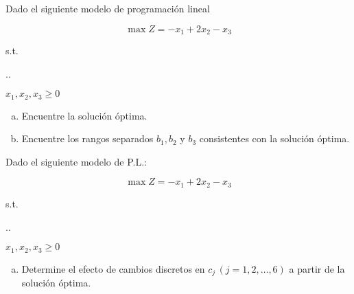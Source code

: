 \documentclass[spanish,letterpaper,11pt]{exam}
\author{Dr. Rafael Torres Escobar}
\begin{document}
\begin{questions}
    \question
    Dado el siguiente modelo de programación lineal

    \[ \max Z = -x_1 + 2x_2 - x_3 \]
  
{\centering
\vspace{2mm}
s.t.
\vspace{2mm}

%
\sysdelim..%

\vspace{3mm}
$x_1, x_2, x_3 \geq 0$
\par}
  
\begin{enumerate}[a)] 
\item Encuentre la solución óptima.
  
\item Encuentre los rangos separados $b_1, b_2 $ y $b_3$ consistentes con la solución óptima.
  
\end{enumerate}




  
\vspace{6mm}

  \question
  Dado el siguiente modelo de P.L.:

  \[ \max Z = -x_1 + 2x_2 - x_3 \]

  
{\centering
\vspace{2mm}
s.t.
\vspace{2mm}

%
\sysdelim..%

\vspace{3mm}

$x_1,x_2,x_3 \geq 0$
\par}


\begin{enumerate}[a)]
    \item Determine el efecto de cambios discretos en $c_j \, (j = 1,2,\ldots,6)$ a partir de la solución óptima.
\end{enumerate}

\end{questions}
\end{document}
